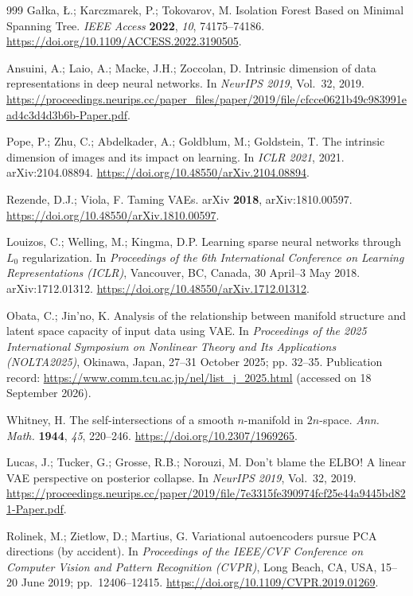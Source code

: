 \documentclass[11pt,a4paper]{ltjsarticle}
\begin{document}
\begin{thebibliography}{999}
Ga{\l}ka, {\L}.; Karczmarek, P.; Tokovarov, M.
Isolation Forest Based on Minimal Spanning Tree.
\textit{IEEE Access} \textbf{2022}, \textit{10}, 74175--74186.
\url{https://doi.org/10.1109/ACCESS.2022.3190505}.

Ansuini, A.; Laio, A.; Macke, J.H.; Zoccolan, D.
Intrinsic dimension of data representations in deep neural networks.
In \textit{NeurIPS 2019}, Vol.~32, 2019. \url{https://proceedings.neurips.cc/paper_files/paper/2019/file/cfcce0621b49c983991ead4c3d4d3b6b-Paper.pdf}.

Pope, P.; Zhu, C.; Abdelkader, A.; Goldblum, M.; Goldstein, T.
The intrinsic dimension of images and its impact on learning.
In \textit{ICLR 2021}, 2021. arXiv:2104.08894. \url{https://doi.org/10.48550/arXiv.2104.08894}.

Rezende, D.J.; Viola, F.
Taming VAEs.
arXiv \textbf{2018}, arXiv:1810.00597.
\url{https://doi.org/10.48550/arXiv.1810.00597}.

Louizos, C.; Welling, M.; Kingma, D.P.
Learning sparse neural networks through $L_0$ regularization.
In \textit{Proceedings of the 6th International Conference on Learning
Representations (ICLR)}, Vancouver, BC, Canada, 30 April--3 May 2018.
arXiv:1712.01312. \url{https://doi.org/10.48550/arXiv.1712.01312}.

Obata, C.; Jin'no, K.
Analysis of the relationship between manifold structure and latent space
capacity of input data using VAE.
In \textit{Proceedings of the 2025 International Symposium on Nonlinear
Theory and Its Applications (NOLTA2025)}, Okinawa, Japan, 27--31 October
2025; pp. 32--35.
Publication record: \url{https://www.comm.tcu.ac.jp/nel/list_j_2025.html}
(accessed on 18 September 2026).

Whitney, H.
The self-intersections of a smooth $n$-manifold in $2n$-space.
\textit{Ann. Math.} \textbf{1944}, \textit{45}, 220--246.
\url{https://doi.org/10.2307/1969265}.

Lucas, J.; Tucker, G.; Grosse, R.B.; Norouzi, M.
Don't blame the ELBO! A linear VAE perspective on posterior collapse.
In \textit{NeurIPS 2019}, Vol.~32, 2019. \url{https://proceedings.neurips.cc/paper/2019/file/7e3315fe390974fcf25e44a9445bd821-Paper.pdf}.

Rolinek, M.; Zietlow, D.; Martius, G.
Variational autoencoders pursue PCA directions (by accident).
In \textit{Proceedings of the IEEE/CVF Conference on Computer Vision and
Pattern Recognition (CVPR)}, Long Beach, CA, USA, 15--20 June 2019;
pp.\ 12406--12415. \url{https://doi.org/10.1109/CVPR.2019.01269}.


\end{thebibliography}
\end{document}
